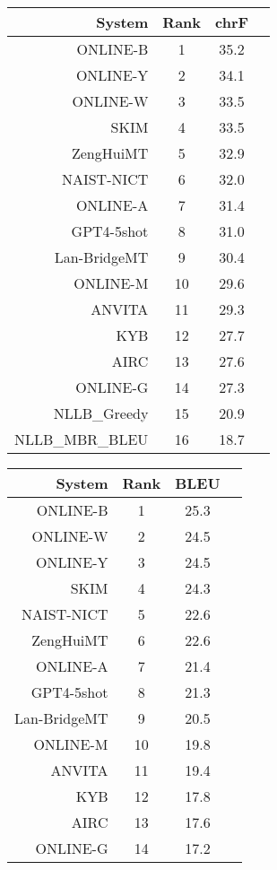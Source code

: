 \documentclass[11pt]{article}
\begin{document}
\begin{table}  
\scriptsize\begin{subtable}[t]{0.33\textwidth}
\begin{tabular}{rccc}
\toprule 
System & Rank & chrF \\ 
\midrule 
ONLINE-B & 1 & 35.2 \\ 
ONLINE-Y & 2 & 34.1 \\ 
ONLINE-W & 3 & 33.5 \\ 
SKIM & 4 & 33.5 \\ 
ZengHuiMT & 5 & 32.9 \\ 
NAIST-NICT & 6 & 32.0 \\ 
ONLINE-A & 7 & 31.4 \\ 
GPT4-5shot & 8 & 31.0 \\ 
Lan-BridgeMT & 9 & 30.4 \\ 
ONLINE-M & 10 & 29.6 \\ 
ANVITA & 11 & 29.3 \\ 
KYB & 12 & 27.7 \\ 
AIRC & 13 & 27.6 \\ 
ONLINE-G & 14 & 27.3 \\ 
NLLB\_Greedy & 15 & 20.9 \\ 
NLLB\_MBR\_BLEU & 16 & 18.7 \\ 
\bottomrule 
\end{tabular} 
\end{subtable} 
\begin{subtable}[t]{0.33\textwidth}
\begin{tabular}{rccc}
\toprule 
System & Rank & BLEU \\ 
\midrule 
ONLINE-B & 1 & 25.3 \\ 
ONLINE-W & 2 & 24.5 \\ 
ONLINE-Y & 3 & 24.5 \\ 
SKIM & 4 & 24.3 \\ 
NAIST-NICT & 5 & 22.6 \\ 
ZengHuiMT & 6 & 22.6 \\ 
ONLINE-A & 7 & 21.4 \\ 
GPT4-5shot & 8 & 21.3 \\ 
Lan-BridgeMT & 9 & 20.5 \\ 
ONLINE-M & 10 & 19.8 \\ 
ANVITA & 11 & 19.4 \\ 
KYB & 12 & 17.8 \\ 
AIRC & 13 & 17.6 \\ 
ONLINE-G & 14 & 17.2 \\ 

\end{tabular}
\end{subtable}
\end{table}
\end{document}
